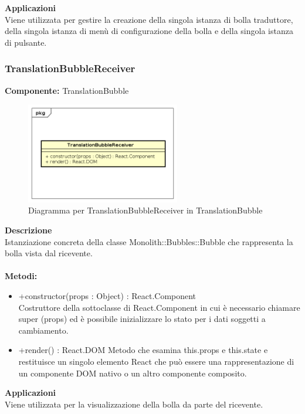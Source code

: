 \textbf{Applicazioni}\\
Viene utilizzata per gestire la creazione della singola istanza di bolla traduttore, della singola istanza di menù di configurazione della bolla e della singola istanza di pulsante. 


\clearpage

\subsubsection{TranslationBubbleReceiver}
\textbf{Componente:}  TranslationBubble\\
   \FloatBarrier
   \begin{figure}[ht]
   \centering
   \includegraphics[width=0.6\textwidth]{img/single-TranslationBubbleReceiver}
   \caption{{Diagramma per TranslationBubbleReceiver in TranslationBubble}}
\end{figure}
\FloatBarrier
\textbf{Descrizione}\\
Istanziazione concreta della classe Monolith::Bubbles::Bubble che rappresenta la bolla vista dal ricevente.
\\
\\
\textbf{Metodi:} 
\begin{itemize}
\item +constructor(props : Object) : React.Component 
\\
Costruttore della sottoclasse di React.Component in cui è necessario chiamare super (props) ed è possibile inizializzare lo stato per i dati soggetti a cambiamento.

\item +render() : React.DOM
Metodo che esamina this.props e this.state e restituisce un singolo elemento React che può essere una rappresentazione di un componente DOM nativo o un altro componente composito.

\end{itemize} 


\textbf{Applicazioni}\\
Viene utilizzata per la visualizzazione della bolla da parte del ricevente. 


